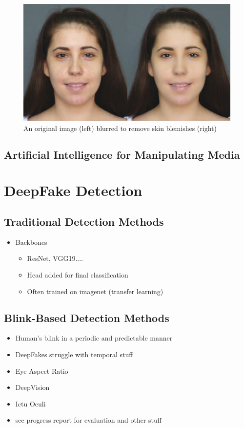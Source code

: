 \begin{figure}[H]
    \centering
    \includegraphics[width=0.5\linewidth]{dissertation//figures/blurring.png}
    \caption{An original image (left) blurred to remove skin blemishes (right)\cite{corcoran2014digital}}
    \label{fig:beauty-filter}
\end{figure}

\subsection{Artificial Intelligence for Manipulating Media}



\section{DeepFake Detection}

\subsection{Traditional Detection Methods}

\begin{itemize}
    \item Backbones
    \begin{itemize}
        \item ResNet, VGG19....
        \item Head added for final classification
        \item Often trained on imagenet (transfer learning)
    \end{itemize}
\end{itemize}

\subsection{Blink-Based Detection Methods}

\begin{itemize}
    \item Human's blink in a periodic and predictable manner
    \item DeepFakes struggle with temporal stuff
    \item Eye Aspect Ratio
    \item DeepVision
    \item Ictu Oculi
    \item see progress report for evaluation and other stuff
\end{itemize}

